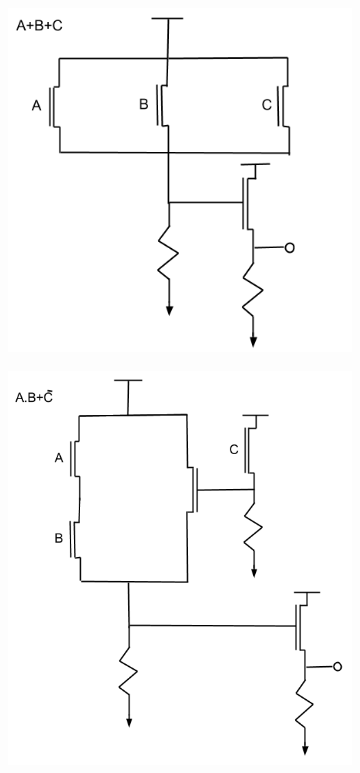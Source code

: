 {	\begin{solution}
		\begin{figure}[h!]
			\centering
			\begin{subfigure}[H]{0.4\textwidth}
				\includegraphics[width=\textwidth]{images/solution431.png}
			\end{subfigure}
			\begin{subfigure}[H]{0.4\textwidth}
				\includegraphics[width=\textwidth]{images/solution432.png}

\end{subfigure}
\end{figure}
\end{solution}}
